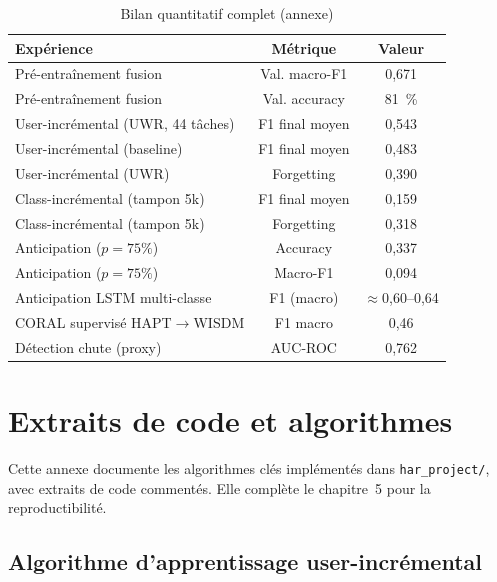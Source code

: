 \documentclass[a4paper,12pt]{report}
\begin{document}
\begin{table}[H]
\centering
\small
\begin{tabularx}{\textwidth}{|Y|c|c|}
\hline
\textbf{Expérience} & \textbf{Métrique} & \textbf{Valeur} \\
\hline
Pré-entraînement fusion & Val. macro-F1 & 0,671 \\
Pré-entraînement fusion & Val. accuracy & 81~\% \\
\hline
User-incrémental (UWR, 44 tâches) & F1 final moyen & 0,543 \\
User-incrémental (baseline) & F1 final moyen & 0,483 \\
User-incrémental (UWR) & Forgetting & 0,390 \\
\hline
Class-incrémental (tampon 5k) & F1 final moyen & 0,159 \\
Class-incrémental (tampon 5k) & Forgetting & 0,318 \\
\hline
Anticipation ($p=75\%$) & Accuracy & 0,337 \\
Anticipation ($p=75\%$) & Macro-F1 & 0,094 \\
Anticipation LSTM multi-classe & F1 (macro) & $\approx$0,60--0,64 \\
\hline
CORAL supervisé HAPT$\rightarrow$WISDM & F1 macro & 0,46 \\
Détection chute (proxy) & AUC-ROC & 0,762 \\
\hline
\end{tabularx}
\caption{Bilan quantitatif complet (annexe)}
\label{tab:app_bilan_complet}
\end{table}

\FloatBarrier



\chapter{Extraits de code et algorithmes}
\label{app:code}

Cette annexe documente les algorithmes clés implémentés dans
\texttt{har\_project/}, avec extraits de code commentés. Elle complète le
chapitre~5 pour la reproductibilité.

\section{Algorithme d'apprentissage user-incrémental}
\end{document}
